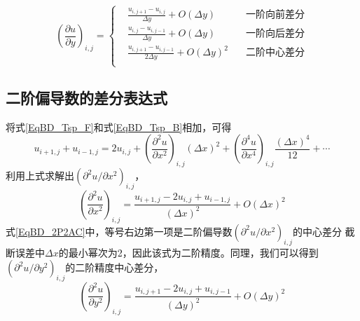\begin{equation}
  \left(
    \frac{\partial u}{\partial y}
  \right)_{i,j}
  =
  \left\{
    \begin{aligned}
      &\frac{u_{i,j+1}-u_{i,j}}{\Delta y} + O(\Delta y) & \mbox{一阶向前差分} \\
      &\frac{u_{i,j}-u_{i,j-1}}{\Delta y} + O(\Delta y) & \mbox{一阶向后差分} \\
      &\frac{u_{i,j+1}-u_{i,j-1}}{2\Delta y} + O(\Delta y)^{2} \quad& \mbox{二阶中心差分} \\
    \end{aligned}
  \right.
\end{equation}

\subsection{二阶偏导数的差分表达式}
将式\eqref{EqBD_Tsp_F}和式\eqref{EqBD_Tsp_B}相加，可得
\begin{equation}
  u_{i+1,j} + u_{i-1,j}
  =
  2u_{i,j}+
  \left(
    \frac{\partial^{2} u}{\partial x^{2}}
  \right)_{i,j}(\Delta x)^{2}
  +
  \left(
    \frac{\partial^{4} u}{\partial x^{4}}
  \right)_{i,j}\frac{(\Delta x)^{4}}{12}
  +
  \cdots
\end{equation}
利用上式求解出$(\partial^{2}u/\partial x^{2})_{i,j}$，
\begin{equation}
  \left(
    \frac{\partial^{2} u}{\partial x^{2}} 
  \right)_{i,j}
  =
  \frac{u_{i+1,j}-2u_{i,j}+u_{i-1,j}}{(\Delta x)^{2}}
  +
  O(\Delta x)^2
  \label{EqBD_2P2AC}
\end{equation}
式\eqref{EqBD_2P2AC}中，等号右边第一项是二阶偏导数$(\partial^{2}u/\partial x^{2})_{i,j}$的中心差分
截断误差中$\Delta x$的最小幂次为2，因此该式为二阶精度。同理，我们可以得到
$(\partial^{2}u/\partial y^{2})_{i,j}$的二阶精度中心差分，
\begin{equation}
  \left(
    \frac{\partial^{2} u}{\partial y^{2}} 
  \right)_{i,j}
  =
  \frac{u_{i,j+1}-2u_{i,j}+u_{i,j-1}}{(\Delta y)^{2}}
  +
  O(\Delta y)^2
  \label{EqBD_2Py2AC}
\end{equation}

